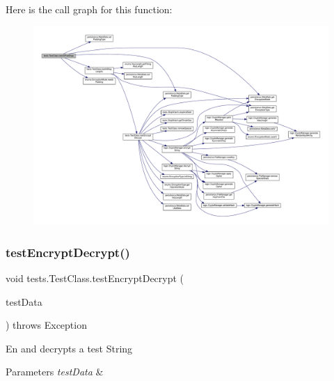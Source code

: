 Here is the call graph for this function\+:\nopagebreak
\begin{figure}[H]
\begin{center}
\leavevmode
\includegraphics[width=350pt]{classtests_1_1_test_class_ad9f19e80ff161cfedfbfe4ba527c0074_cgraph}
\end{center}
\end{figure}
\mbox{\label{classtests_1_1_test_class_a11145228e7254b6763247dcdb84d1805}} 
\subsubsection{\texorpdfstring{test\+Encrypt\+Decrypt()}{testEncryptDecrypt()}}
{\footnotesize\ttfamily void tests.\+Test\+Class.\+test\+Encrypt\+Decrypt (\begin{DoxyParamCaption}\item[{\mbox{\hyperlink{classpersistence_1_1_meta_data}{Meta\+Data}}}]{test\+Data }\end{DoxyParamCaption}) throws Exception}

En and decrypts a test String 
\begin{DoxyParams}{Parameters}
{\em test\+Data} & \\
\hline
\end{DoxyParams}

